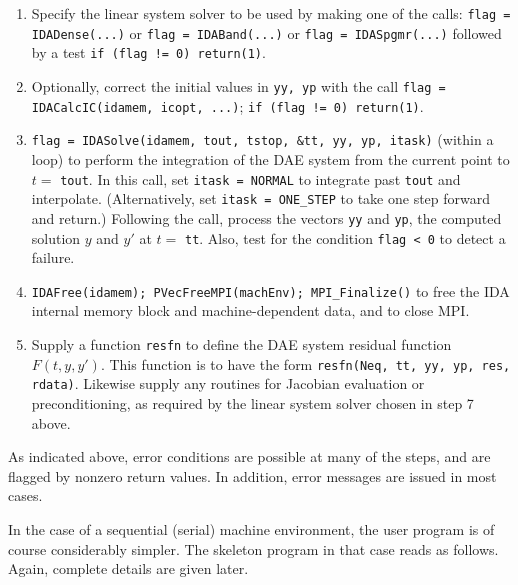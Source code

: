 \begin{enumerate}
\item Specify the linear system solver to be used by making one of the
calls: \newline 
{\tt flag = IDADense(...)} or {\tt flag = IDABand(...)} or
{\tt flag = IDASpgmr(...)} \newline
followed by a test {\tt if (flag != 0) return(1)}.

\item Optionally, correct the initial values in {\tt yy, yp} with 
the call \newline
{\tt flag = IDACalcIC(idamem, icopt, ...)}; {\tt if (flag != 0) return(1)}.

\item {\tt flag = IDASolve(idamem, tout, tstop, \&tt, yy, yp, itask)} 
\newline (within a loop) to perform the integration of the DAE system 
from the current point to $t =$ {\tt tout}.  In this call, set 
{\tt itask = NORMAL} to integrate past {\tt tout} and interpolate.
(Alternatively, set {\tt itask = ONE\_STEP} to take one step forward
and return.)  Following the call, process the vectors {\tt yy} and 
{\tt yp}, the computed solution $y$ and $y'$ at $t = $ {\tt tt}.
Also, test for the condition {\tt flag < 0} to detect a failure.

\item {\tt IDAFree(idamem); PVecFreeMPI(machEnv); MPI\_Finalize()} to
free the IDA internal memory block and machine-dependent data, and 
to close MPI.

\item Supply a function {\tt resfn} to define the DAE system residual 
function $F(t,y,y')$.  This function is to have the form 
{\tt resfn(Neq, tt, yy, yp, res, rdata)}.  Likewise supply any
routines for Jacobian evaluation or preconditioning, as required by
the linear system solver chosen in step 7 above.

\end{enumerate}

\vspace{.1 in}

As indicated above, error conditions are possible at many of the
steps, and are flagged by nonzero return values.  In addition, error
messages are issued in most cases.

In the case of a sequential (serial) machine environment, the user
program is of course considerably simpler.  The skeleton program in
that case reads as follows.  Again, complete details are given later.

